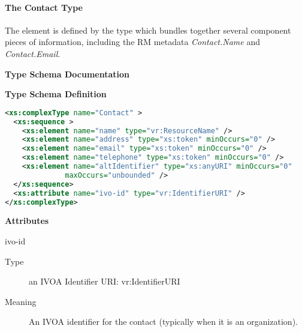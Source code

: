 \documentclass[11pt,a4paper]{ivoa}
\begin{document}

\paragraph{The Contact Type}

The  element is defined by the
 type which bundles together several component
pieces of information, including the RM metadata \emph{Contact.Name}
and \emph{Contact.Email}.  



\begin{generated}
\begingroup
      	\renewcommand*\descriptionlabel[1]{%
      	\hbox to 5.5em{\emph{#1}\hfil}}\vspace{2ex}\noindent\textbf{ Type Schema Documentation}


\vspace{1ex}\noindent\textbf{ Type Schema Definition}

\begin{lstlisting}[language=XML,basicstyle=\footnotesize]
<xs:complexType name="Contact" >
  <xs:sequence >
    <xs:element name="name" type="vr:ResourceName" />
    <xs:element name="address" type="xs:token" minOccurs="0" />
    <xs:element name="email" type="xs:token" minOccurs="0" />
    <xs:element name="telephone" type="xs:token" minOccurs="0" />
    <xs:element name="altIdentifier" type="xs:anyURI" minOccurs="0"
              maxOccurs="unbounded" />
  </xs:sequence>
  <xs:attribute name="ivo-id" type="vr:IdentifierURI" />
</xs:complexType>
\end{lstlisting}

\vspace{0.5ex}\noindent\textbf{ Attributes}

\begingroup\small\begin{bigdescription}
\item[ivo-id]
\begin{description}
\item[Type] an IVOA Identifier URI: vr:IdentifierURI
\item[Meaning] 
             An IVOA identifier for the contact (typically when it is
             an organization).
           

\end{description}
\end{bigdescription}
\end{generated}
\end{document}
